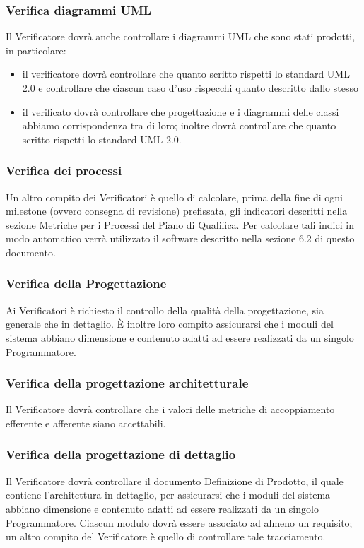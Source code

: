\subsubsection{Verifica diagrammi UML}
Il Verificatore dovrà anche controllare i diagrammi UML che sono stati prodotti, in particolare:
\begin{itemize}
\item {} il verificatore dovrà controllare che quanto scritto rispetti lo standard UML 2.0 e controllare che ciascun caso d'uso rispecchi quanto descritto dallo stesso
\item {} il verificato dovrà controllare che progettazione e i diagrammi delle classi abbiamo corrispondenza tra di loro; inoltre dovrà controllare che quanto scritto rispetti lo standard UML 2.0.
\end{itemize}

\subsubsection{Verifica dei processi}
Un altro compito dei Verificatori è quello di calcolare, prima della fine di ogni milestone (ovvero consegna di revisione) prefissata, gli indicatori descritti nella sezione Metriche per i Processi del Piano di Qualifica. Per calcolare tali indici in modo automatico verrà utilizzato il software descritto nella sezione 6.2 di questo documento.

\subsubsection{Verifica della Progettazione}
\label{}
Ai Verificatori è richiesto il controllo della qualità della progettazione, sia generale che in dettaglio.
È inoltre loro compito assicurarsi che i moduli del sistema abbiano dimensione e contenuto adatti ad essere realizzati da un singolo Programmatore.

\subsubsection{Verifica della progettazione architetturale}
Il Verificatore dovrà controllare che i valori delle metriche di accoppiamento efferente e afferente siano accettabili.

\subsubsection{Verifica della progettazione di dettaglio}
Il Verificatore dovrà controllare il documento Definizione di Prodotto, il quale contiene l'architettura in dettaglio, per assicurarsi che i moduli del sistema abbiano dimensione e contenuto adatti ad essere realizzati da un singolo Programmatore.
Ciascun modulo dovrà essere associato ad almeno un requisito; un altro compito del Verificatore è quello di controllare tale tracciamento.

